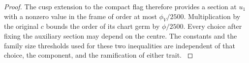 \begin{proof}
The cusp extension to the compact flag therefore
provides a section at \(u_1\) with a nonzero value in the frame of order at most \(\phi_V/2500\). Multiplication by the
original \(c\) bounds the order of its chart germ by
\(\phi/2500\). Every choice after fixing the auxiliary
section may depend on the centre. The constants and
the family size thresholds used for these two inequalities
are independent of that choice, the component, and the
ramification of either trait.
\label{cor:deep-boundary-orders-7}
\end{proof}
